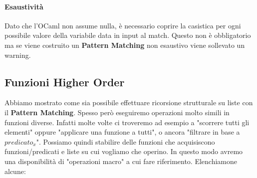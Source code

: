 \documentclass{article}
\begin{document}
\vspace*{10px}

\paragraph{Esaustività}

Dato che l'OCaml non assume nulla, è necessario coprire la casistica per ogni possibile valore della variabile data in input al match. Questo non è obbligatorio ma se viene costruito un \textbf{Pattern Matching} non esaustivo viene sollevato un warning.

\newpage

\subsection{Funzioni Higher Order}

Abbiamo mostrato come sia possibile effettuare ricorsione strutturale su liste con il \textbf{Pattern Matching}. Spesso però eseguiremo operazioni molto simili in funzioni diverse. Infatti molte volte ci troveremo ad esempio a "scorrere tutti gli elementi" oppure "applicare una funzione a tutti", o ancora "filtrare in base a $ predicato_{x} $". Possiamo quindi stabilire delle funzioni che acquisiscono funzioni/predicati e liste su cui vogliamo che operino. In questo modo avremo una disponibilità di "operazioni macro" a cui fare riferimento. Elenchiamone alcune:
\end{document}
